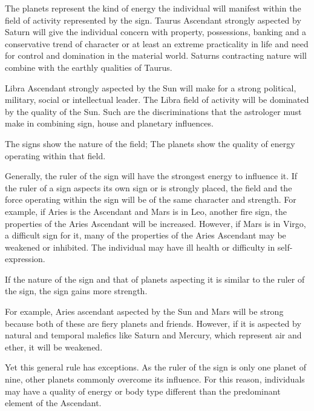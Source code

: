  

The planets represent the kind of energy the individual will manifest within the field of activity represented by the sign. Taurus Ascendant strongly aspected by Saturn will give the individual concern with property, possessions, banking and a conservative trend of character or at least an extreme practicality in life and need for control and domination in the material world. Saturns contracting nature will combine with the earthly qualities of Taurus.

 

Libra Ascendant strongly aspected by the Sun will make for a strong political, military, social or intellectual leader. The Libra field of activity will be dominated by the quality of the Sun. Such are the discriminations that the astrologer must make in combining sign, house and planetary influences.

 

The signs show the nature of the field;
The planets show the quality of energy operating within that field.
 

Generally, the ruler of the sign will have the strongest energy to influence it. If the ruler of a sign aspects its own sign or is strongly placed, the field and the force operating within the sign will be of the same character and strength. For example, if Aries is the Ascendant and Mars is in Leo, another fire sign, the properties of the Aries Ascendant will be increased. However, if Mars is in Virgo, a difficult sign for it, many of the properties of the Aries Ascendant may be weakened or inhibited. The individual may have ill health or difficulty in self-expression.

 

If the nature of the sign and that of planets aspecting it is similar to the ruler of the sign, the sign gains more strength.
 

For example, Aries ascendant aspected by the Sun and Mars will be strong because both of these are fiery planets and friends. However, if it is aspected by natural and temporal malefics like Saturn and Mercury, which represent air and ether, it will be weakened.

 

Yet this general rule has exceptions. As the ruler of the sign is only one planet of nine, other planets commonly overcome its influence. For this reason, individuals may have a quality of energy or body type different than the predominant element of the Ascendant.

